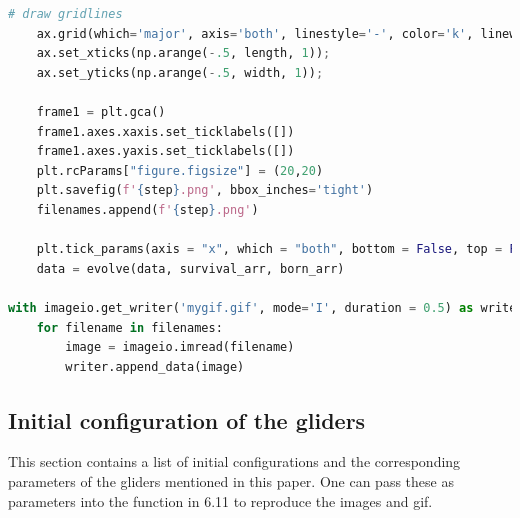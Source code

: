 \documentclass[12pt]{article}
\numberwithin{figure}{section} %
\begin{document}
\begin{lstlisting}[language = Python]
    # draw gridlines
    ax.grid(which='major', axis='both', linestyle='-', color='k', linewidth=2)
    ax.set_xticks(np.arange(-.5, length, 1));
    ax.set_yticks(np.arange(-.5, width, 1));

    frame1 = plt.gca()
    frame1.axes.xaxis.set_ticklabels([])
    frame1.axes.yaxis.set_ticklabels([])
    plt.rcParams["figure.figsize"] = (20,20)
    plt.savefig(f'{step}.png', bbox_inches='tight')
    filenames.append(f'{step}.png')
    
    plt.tick_params(axis = "x", which = "both", bottom = False, top = False)
    data = evolve(data, survival_arr, born_arr)

with imageio.get_writer('mygif.gif', mode='I', duration = 0.5) as writer:
    for filename in filenames:
        image = imageio.imread(filename)
        writer.append_data(image)
\end{lstlisting}

\subsection{Initial configuration of the gliders}
\label{subsection:Initial configuration of the gliders}
This section contains a list of initial configurations and the corresponding parameters of the gliders mentioned in this paper. One can pass these as parameters into the function in 6.11 to reproduce the images and gif. 
\end{document}
